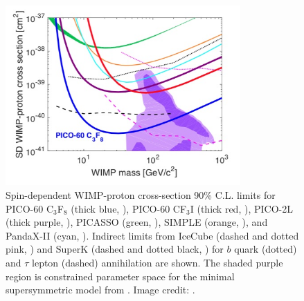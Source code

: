 \begin{figure}
 \centering
 \includegraphics[width=0.8\textwidth]{spin_dependent_limits}
 \caption[Spin-dependent WIMP-proton cross-section 90\% C.L. limits.]{Spin-dependent WIMP-proton cross-section 90\% C.L. limits for PICO-60
 C$_{3}$F${_8}$ (thick blue, ), PICO-60 CF$_{3}$I (thick red,
 ), PICO-2L (thick purple, ), PICASSO (green, ), SIMPLE (orange,
 ), and PandaX-II (cyan, ).  Indirect limits from IceCube
 (dashed and dotted pink, ) and SuperK (dashed and
 dotted black, ) for $b$ quark (dotted) and $\tau$ lepton (dashed)
 annihilation are shown.  The shaded purple region is constrained parameter space for the minimal
 supersymmetric model from .
 Image credit: .}
 \label{fig:sd_limits}
\end{figure}


